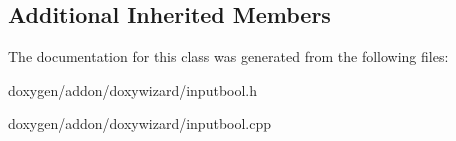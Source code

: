 \subsection*{Additional Inherited Members}


The documentation for this class was generated from the following files\+:\begin{DoxyCompactItemize}
\item 
doxygen/addon/doxywizard/inputbool.\+h\item 
doxygen/addon/doxywizard/inputbool.\+cpp\end{DoxyCompactItemize}
